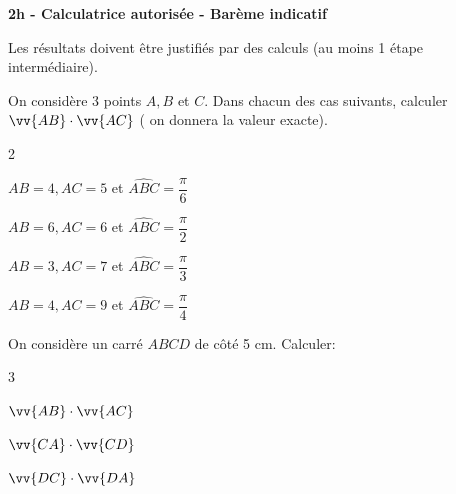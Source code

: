 \documentclass[12pt,a4paper]{article}  %
\begin{document}
\graphicspath{{../../images/}}

\begin{center}

\end{center}


\begin{center}\textbf{2h - Calculatrice autorisée - Barème indicatif}\end{center}


\begin{center}
Les résultats doivent être justifiés par des calculs (au moins 1 étape intermédiaire).
\end{center}

\vspace{-.3cm} 
On considère 3 points $A, B$ et $C$. Dans chacun des cas suivants, calculer $\vv{A B} \cdot \vv{A C}$ ( on donnera la valeur exacte).
\begin{multicols}{2}
\begin{enumMet}
    \item $A B=4, A C=5$ et $\widehat{A B C}=\dfrac{\pi}{6}$
    \item $A B=6, A C=6$ et $\widehat{A B C}=\dfrac{\pi}{2}$
    \item $A B=3, A C=7$ et $\widehat{A B C}=\dfrac{\pi}{3}$
    \item $A B=4, A C=9$ et $\widehat{A B C}=\dfrac{\pi}{4}$
\end{enumMet}
\end{multicols}

\vspace{-0.3cm}
On considère un carré $A B C D$ de côté 5 cm. Calculer:
\begin{multicols}{3}
\begin{enumMet}
    \item $\vv{A B} \cdot \vv{A C}$
    \item $\vv{C A} \cdot \vv{C D}$
    \item $\vv{D C} \cdot \vv{D A}$
\end{enumMet}
\end{multicols}
\end{document}
